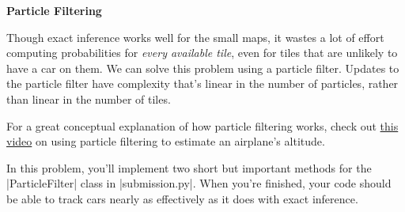 \item {\bf Particle Filtering}

Though exact inference works well for the small maps, it wastes a lot of effort
computing probabilities for {\em every available tile}, even for tiles that are
unlikely to have a car on them.  We can solve this problem using a particle
filter. Updates to the particle filter have complexity that's linear in the
number of particles, rather than linear in the number of tiles.

For a great conceptual explanation of how particle filtering works, check out
\href{https://www.youtube.com/watch?v=aUkBa1zMKv4}{this video} on using particle 
filtering to estimate an airplane's altitude. 

In this problem, you'll implement two short but important methods for the
|ParticleFilter| class in |submission.py|. When you're finished, your code
should be able to track cars nearly as effectively as it does with exact
inference.

\begin{enumerate}

  

\end{enumerate}
